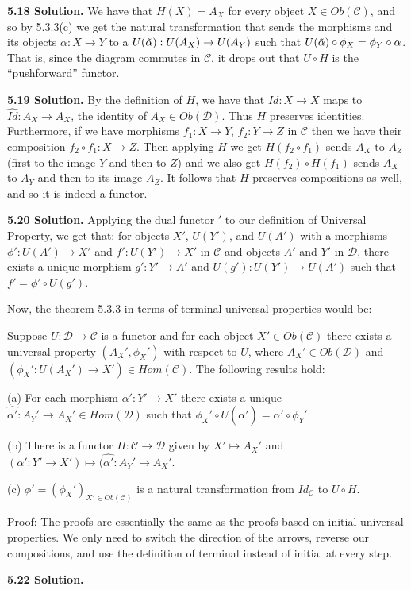 \textbf{5.18 Solution.} We have that $H(X) = A_X$ for every object $X \in Ob(\mathcal{C})$, and so by 5.3.3(c) we get the natural transformation that sends the morphisms and its objects $\alpha: X \to Y$ to a $U(\Tilde{\alpha}): U(A_X) \to U(A_Y)$ such that $U(\Tilde{\alpha}) \circ \phi_X = \phi_Y \circ \alpha$. That is, since the diagram commutes in $\mathcal{C}$, it drops out that $U \circ H$ is the ``pushforward'' functor.

\textbf{5.19 Solution.} By the definition of $H$, we have that $Id: X \to X$ maps to $\hat{Id}: A_X \to A_X$, the identity of $A_X \in Ob(\mathcal{D})$. Thus $H$ preserves identities. Furthermore, if we have morphisms $f_1: X \to Y$, $f_2: Y \to Z$ in $\mathcal{C}$ then we have their composition $f_2 \circ f_1: X \to Z$. Then applying $H$ we get $H(f_2 \circ f_1)$ sends $A_X$ to $A_Z$ (first to the image $Y$ and then to $Z$) and we also get $H(f_2) \circ H(f_1)$ sends $A_X$ to $A_Y$ and then to its image $A_Z$. It follows that $H$ preserves compositions as well, and so it is indeed a functor.

\textbf{5.20 Solution.} Applying the dual functor $'$ to our definition of Universal Property, we get that: for objects $X'$, $U(Y')$, and $U(A')$ with a morphisms $\phi': U(A') \to X'$ and $f': U(Y') \to X'$ in $\mathcal{C}$ and objects $A'$ and $Y'$ in $\mathcal{D}$, there exists a unique morphism $g': Y' \to A'$ and $U(g'): U(Y') \to U(A')$ such that $f' = \phi' \circ U(g')$.

Now, the theorem 5.3.3 in terms of terminal universal properties would be:

Suppose $U: \mathcal{D} \to \mathcal{C}$ is a functor and for each object $X' \in Ob(\mathcal{C})$ there exists a universal property $(A_X', \phi_X')$ with respect to $U$, where $A_X' \in Ob(\mathcal{D})$ and $(\phi_X': U(A_X') \to X') \in Hom(\mathcal{C})$. The following results hold:

(a) For each morphism $\alpha': Y' \to X'$ there exists a unique $\hat{\alpha'}: A_Y' \to A_X' \in Hom(\mathcal{D})$ such that $\phi_X' \circ U(\hat{\alpha'}) = \alpha' \circ \phi_Y'$.

(b) There is a functor $H: \mathcal{C} \to \mathcal{D}$ given by $X' \mapsto A_X'$ and $(\alpha':Y' \to X') \mapsto (\hat{\alpha'}: A_Y' \to A_X'$.

(c) $\phi' = (\phi_X')_{X' \in Ob(\mathcal{C})}$ is a natural transformation from $Id_{\mathcal{C}}$ to $U \circ H$.

Proof: The proofs are essentially the same as the proofs based on initial universal properties. We only need to switch the direction of the arrows, reverse our compositions, and use the definition of terminal instead of initial at every step.

\textbf{5.22 Solution.}